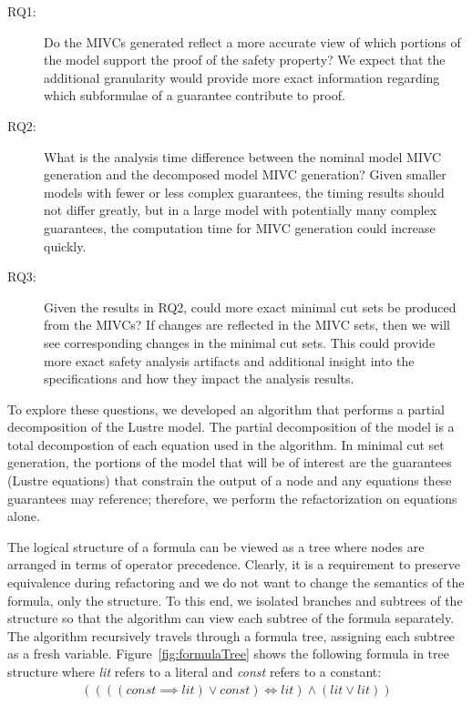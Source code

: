 \begin{description}
\item[RQ1:] Do the MIVCs generated reflect a more accurate view of which portions of the model support the proof of the safety property? We expect that the additional granularity would provide more exact information regarding which subformulae of a guarantee contribute to proof.

\item [RQ2:] What is the analysis time difference between the nominal model MIVC generation and the decomposed model MIVC generation? Given smaller models with fewer or less complex guarantees, the timing results should not differ greatly, but in a large model with potentially many complex guarantees, the computation time for MIVC generation could increase quickly. 

\item[RQ3:] Given the results in RQ2, could more exact minimal cut sets be produced from the MIVCs? If changes are reflected in the MIVC sets, then we will see corresponding changes in the minimal cut sets. This could provide more exact safety analysis artifacts and additional insight into the specifications and how they impact the analysis results. 
\end{description}

To explore these questions, we developed an algorithm that performs a partial decomposition of the  Lustre model. The partial decomposition of the model is a total decompostion of each equation used in the \aivcalg algorithm. In minimal cut set generation, the portions of the model that will be of interest are the guarantees (Lustre equations) that constrain the output of a node and any equations these guarantees may reference; therefore, we perform the refactorization on equations alone. 

The logical structure of a formula can be viewed as a tree where nodes are arranged in terms of operator precedence. Clearly, it is a requirement to preserve equivalence during refactoring and we do not want to change the semantics of the formula, only the structure. To this end, we isolated branches and subtrees of the structure so that the \aivcalg algorithm can view each subtree of the formula separately. The algorithm recursively travels through a formula tree, assigning each subtree as a fresh variable. Figure~\ref{fig:formulaTree} shows the following formula in tree structure where \textit{lit} refers to a literal and \textit{const} refers to a constant:
\begin{gather*}
((((\mathit{const} \implies \mathit{lit}) \lor \mathit{const}) \iff \mathit{lit} ) \land (\mathit{lit}  \lor \mathit{lit} )) 
\end{gather*} 

